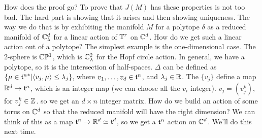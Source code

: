  How does the proof go?  To prove that $J(M)$ has these properties is not too bad.
 The hard part is showing that it arises and then showing uniqueness.  The way we do
 that is by exhibiting the manifold $M$ for a polytope $\delta$ as a reduced manifold
 of $\mathbb{C}^d_\lambda$ for a linear action of $\mathbb{T}^r$ on $\mathbb{C}^d$.  How do we get such
 a linear action out of a polytope?  The simplest example is the one-dimensional case.
 The 2-sphere is $\mathbb{C}\mathbb{P}^1$, which is $\mathbb{C}^2_\lambda$ for the Hopf circle action.  In
 general, we have a polytope, so it is the intersection of half-spaces.  $\Delta$ can
 be defined as $\{\mu \in {\ensuremath{\mathfrak{t}}^n}^*|\langle v_j,\mu\rangle \le \lambda_j\}$, where
 $v_1,\dots, v_d\in \mathfrak{t}^n$, and $\lambda_j\in \mathbb{R}$.  The $\{v_j\}$ define a map
 $\mathbb{R}^d\to \mathfrak{t}^n$, which is an integer map (we can choose all the $v_i$ integer).
 $v_j=(v_j^k)$, for $v_j^k\in \mathbb{Z}$.  so we get an $d\times n$ integer matrix.  How do
 we build an action of some torus on $\mathbb{C}^d$ so that the reduced manifold will have
 the right dimension?  We can think of this as a map $\mathfrak{t}^n\to \mathbb{R}^d\simeq \mathfrak{t}^d$, so we
 get a $\mathfrak{t}^n$ action on $\mathbb{C}^d$.  We'll do this next time.
